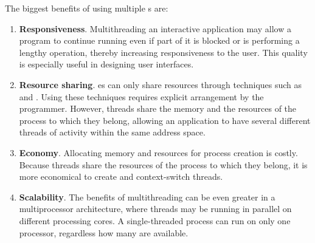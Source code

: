 The biggest benefits of using multiple s are:
\begin{enumerate}[noitemsep]
\item \textbf{Responsiveness}.
  Multithreading an interactive application may allow a program to continue running even if part of it is blocked or is performing a lengthy operation, thereby increasing responsiveness to the user.
  This quality is especially useful in designing user interfaces.
\item \textbf{Resource sharing}.
  es can only share resources through techniques such as  and .
  Using these techniques requires explicit arrangement by the programmer.
  However, threads share the memory and the resources of the process to which they belong, allowing an application to have several different threads of activity within the same address space.
\item \textbf{Economy}.
  Allocating memory and resources for process creation is costly.
  Because threads share the resources of the process to which they belong, it is more economical to create and context-switch threads.
\item \textbf{Scalability}.
  The benefits of multithreading can be even greater in a multiprocessor architecture, where threads may be running in parallel on different processing cores.
  A single-threaded process can run on only one processor, regardless how many are available.
\end{enumerate}


